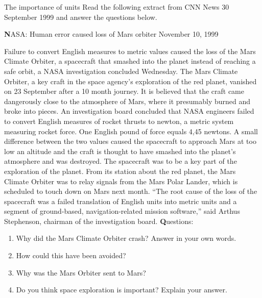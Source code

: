 \begin{casestudy}{The importance of units }
            \nopagebreak
      \label{m30853*id62502}Read the following extract from CNN News 30 September 1999 and answer the questions below.\par 
      \label{m30853*id62508}\textbf{N}ASA: Human error caused loss of Mars orbiter November 10, 1999\par 
      \label{m30853*id62517}Failure to convert English measures to metric values caused the loss of the Mars Climate Orbiter, a spacecraft that smashed into the planet instead of reaching a safe orbit, a NASA investigation concluded Wednesday.
The Mars Climate Orbiter, a key craft in the space agency's exploration of the red planet, vanished on 23 September after a 10 month journey. It is believed that the craft came dangerously close to the atmosphere of Mars, where it presumably burned and broke into pieces.
An investigation board concluded that NASA engineers failed to convert English measures of rocket thrusts to newton, a metric system measuring rocket force. One English pound of force equals 4,45 newtons. A small difference between the two values caused the spacecraft to approach Mars at too low an altitude and the craft is thought to have smashed into the planet's atmosphere and was destroyed.
The spacecraft was to be a key part of the exploration of the planet. From its station about the red planet, the Mars Climate Orbiter was to relay signals from the Mars Polar Lander, which is scheduled to touch down on Mars next month.
``The root cause of the loss of the spacecraft was a failed translation of English units into metric units and a segment of ground-based, navigation-related mission software,'' said Arthus Stephenson, chairman of the investigation board.
\textbf{Q}uestions:\par 
      \label{m30853*id62526}\begin{enumerate}[noitemsep, label=\textbf{\arabic*}. ] 
            \label{m30853*uid51}\item Why did the Mars Climate Orbiter crash? Answer in your own words.
\label{m30853*uid52}\item How could this have been avoided?
\label{m30853*uid53}\item Why was the Mars Orbiter sent to Mars?
\label{m30853*uid54}\item Do you think space exploration is important? Explain your answer.
\end{enumerate}
\end{casestudy}
